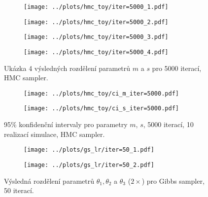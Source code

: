 \documentclass[11pt,oneside,american,czech]{article}
\begin{document}
\begin{figure}
	\centering
	\begin{subfigure}{0.45\textwidth}
		\centering
		\texttt{[image: ../plots/hmc\_toy/iter=5000\_1.pdf]}
	\end{subfigure}
	\hspace{0.5cm}
	\begin{subfigure}{0.45\textwidth}
		\centering
		\texttt{[image: ../plots/hmc\_toy/iter=5000\_2.pdf]}
	\end{subfigure}
	
	\vspace{2cm}
	
	\begin{subfigure}{0.45\textwidth}
		\centering
		\texttt{[image: ../plots/hmc\_toy/iter=5000\_3.pdf]}
	\end{subfigure}
	\hspace{0.5cm}
	\begin{subfigure}{0.45\textwidth}
		\centering
		\texttt{[image: ../plots/hmc\_toy/iter=5000\_4.pdf]}
	\end{subfigure}
	\caption{Ukázka 4 výsledných rozdělení parametrů $m$ a $s$ pro 5000 iterací, HMC sampler.}
	\label{Obr: hmc toy 5000}
\end{figure}

\begin{figure}
	\centering
	\begin{subfigure}{0.46\textwidth}
		\centering
		\texttt{[image: ../plots/hmc\_toy/ci\_m\_iter=5000.pdf]}
	\end{subfigure}
	\hspace{0.5cm}
	\begin{subfigure}{0.46\textwidth}
		\centering
		\texttt{[image: ../plots/hmc\_toy/ci\_s\_iter=5000.pdf]}
	\end{subfigure}
	\caption{95\% konfidenční intervaly pro parametry $m$, $s$, 5000 iterací, 10 realizací simulace, HMC sampler.}
	\label{hmc toy 5000 CI}
\end{figure}


\begin{figure}
	\centering
	\begin{subfigure}{0.95\textwidth}
		\centering
		\texttt{[image: ../plots/gs\_lr/iter=50\_1.pdf]}
	\end{subfigure}
	
	\vspace{1.5cm}
	
	\begin{subfigure}{0.95\textwidth}
		\centering
		\texttt{[image: ../plots/gs\_lr/iter=50\_2.pdf]}
	\end{subfigure}
	\caption{Výsledná rozdělení parametrů $\theta_1, \theta_2$ a $\theta_3$ ($2\times$) pro Gibbs sampler, 50 iterací.}
	\label{Obr: GS LR 50}
\end{figure}
\end{document}

